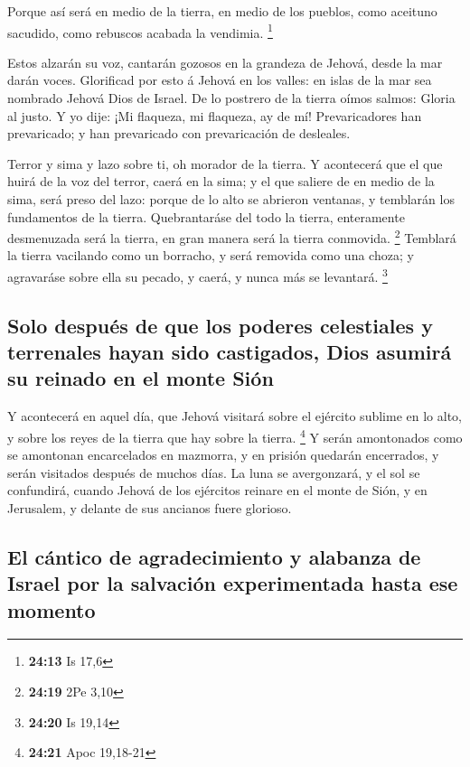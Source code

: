  Porque así será en medio de la tierra, en medio de los
pueblos, como aceituno sacudido, como rebuscos acabada la vendimia.
\footnote{\textbf{24:13} Is 17,6}

 Estos alzarán su voz, cantarán gozosos en la grandeza de
Jehová, desde la mar darán voces.  Glorificad por esto á
Jehová en los valles: en islas de la mar sea nombrado Jehová Dios de
Israel.  De lo postrero de la tierra oímos salmos: Gloria
al justo. Y yo dije: ¡Mi flaqueza, mi flaqueza, ay de mí! Prevaricadores
han prevaricado; y han prevaricado con prevaricación de desleales.

 Terror y sima y lazo sobre ti, oh morador de la tierra.
 Y acontecerá que el que huirá de la voz del terror, caerá
en la sima; y el que saliere de en medio de la sima, será preso del
lazo: porque de lo alto se abrieron ventanas, y temblarán los
fundamentos de la tierra.  Quebrantaráse del todo la
tierra, enteramente desmenuzada será la tierra, en gran manera será la
tierra conmovida. \footnote{\textbf{24:19} 2Pe 3,10} 
Temblará la tierra vacilando como un borracho, y será removida como una
choza; y agravaráse sobre ella su pecado, y caerá, y nunca más se
levantará. \footnote{\textbf{24:20} Is 19,14}

\hypertarget{solo-despuuxe9s-de-que-los-poderes-celestiales-y-terrenales-hayan-sido-castigados-dios-asumiruxe1-su-reinado-en-el-monte-siuxf3n}{%
\subsection{Solo después de que los poderes celestiales y terrenales
hayan sido castigados, Dios asumirá su reinado en el monte
Sión}\label{solo-despuuxe9s-de-que-los-poderes-celestiales-y-terrenales-hayan-sido-castigados-dios-asumiruxe1-su-reinado-en-el-monte-siuxf3n}}

 Y acontecerá en aquel día, que Jehová visitará sobre el
ejército sublime en lo alto, y sobre los reyes de la tierra que hay
sobre la tierra. \footnote{\textbf{24:21} Apoc 19,18-21}  Y
serán amontonados como se amontonan encarcelados en mazmorra, y en
prisión quedarán encerrados, y serán visitados después de muchos días.
 La luna se avergonzará, y el sol se confundirá, cuando
Jehová de los ejércitos reinare en el monte de Sión, y en Jerusalem, y
delante de sus ancianos fuere glorioso.

\hypertarget{el-cuxe1ntico-de-agradecimiento-y-alabanza-de-israel-por-la-salvaciuxf3n-experimentada-hasta-ese-momento}{%
\subsection{El cántico de agradecimiento y alabanza de Israel por la
salvación experimentada hasta ese
momento}\label{el-cuxe1ntico-de-agradecimiento-y-alabanza-de-israel-por-la-salvaciuxf3n-experimentada-hasta-ese-momento}}

